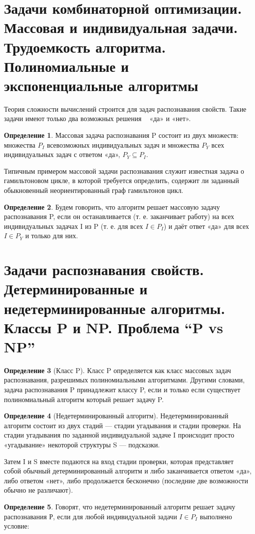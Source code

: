 \documentclass[a4paper]{article}
\theoremstyle{definition}
\newtheorem*{definition}{Определение}
\theoremstyle{remark}
\begin{document}
\begin{multicols*}{2}
    \section{Задачи комбинаторной оптимизации. Массовая и индивидуальная задачи. 
    Трудоемкость алгоритма. Полиномиальные и экспоненциальные алгоритмы}
    Теория сложности вычислений строится для задач распознавания свойств. Такие задачи 
    имеют только два возможных решения ~ «да» и «нет». 
    \begin{definition}
        Массовая задача распознавания P состоит из двух множеств: множества $P_I$
        всевозможных индивидуальных задач и множества $P_Y$ всех индивидуальных задач с 
        ответом «да», $P_Y\subseteq P_I$. 
    \end{definition}    
    Типичным примером массовой задачи распознавания служит известная задача о 
    гамильтоновом цикле, в которой требуется определить, содержит ли заданный 
    обыкновенный неориентированный граф гамильтонов цикл. 
    \begin{definition}
        Будем говорить, что алгоритм решает массовую задачу распознавания P, если он останавливается (т. е. заканчивает работу) на всех индивидуальных задачах I из P (т. е. для всех $ I \in P_I$) и даёт ответ «да» для всех $I \in P_Y$ и только для них. 
    \end{definition}
    \section{Задачи распознавания свойств. Детерминированные и недетерминированные 
    алгоритмы. Классы P и NP. Проблема “P vs NP”}
    \begin{definition}[Класс P]
        Класс P определяется как класс массовых задач распознавания, разрешимых 
    полиномиальными алгоритмами. Другими словами, задача распознавания P принадлежит классу P, если и только если существует полиномиальный алгоритм который решает задачу P.
    \end{definition}
    \begin{definition}[Недетерминированный алгоритм]
        Недетерминированный алгоритм состоит из двух стадий — стадии угадывания и 
        стадии проверки. На стадии угадывания по заданной индивидуальной задаче I
        происходит просто «угадывание» некоторой структуры S — подсказки. 

        Затем I и S вместе подаются на вход стадии проверки, которая представляет собой обычный детерминированный алгоритм и либо заканчивается ответом «да», либо ответом «нет», либо продолжается бесконечно (последние две возможности обычно не различают).
    \end{definition}
    \begin{definition}
        Говорят, что недетерминированный алгоритм решает задачу распознавания Р, если для любой индивидуальной задачи $I \in P_I$ выполнено условие:


\end{definition}
\end{multicols*}
\end{document}
